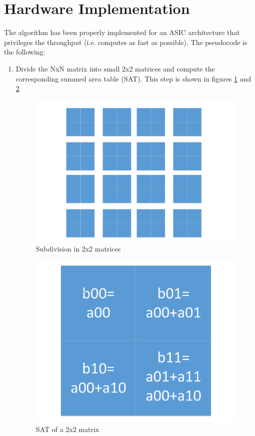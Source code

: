   \section{Hardware Implementation} \label{hiiia}
  The algorithm has been properly implemented for an ASIC architecture that privileges the throughput (i.e. computes as fast as possible).
   The pseudocode is the following:
   \begin{enumerate}
   	
   	\item Divide the NxN matrix into small 2x2 matrices and compute the corresponding summed area table (SAT).
   	This step is shown in figures \ref{fig:IIA1} and \ref{fig:IIA1a}
   	
   	  \begin{figure}[h]
   	  	\centering
   	  	\includegraphics[scale=0.45]{imm/iia/iia_step1}  
   	  	\caption{ Subdivision in 2x2 matrices} 
   	  	\label{fig:IIA1}
   	  \end{figure}
   	
   \begin{figure}[h]
   	\centering
   	\includegraphics[scale=0.25]{imm/iia/iia_step1a}  
   	\caption{SAT of a 2x2 matrix} 
   	\label{fig:IIA1a}
   \end{figure}
   

\end{enumerate}
